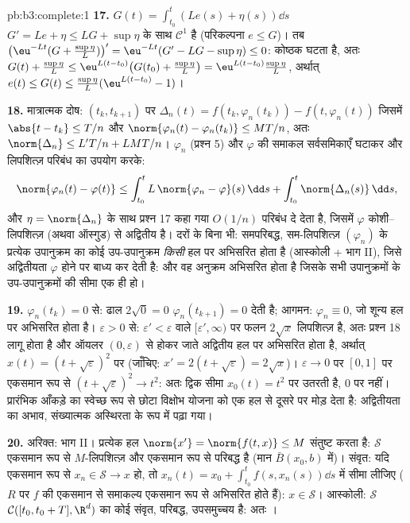 \begin{solution}{pb:b3:complete:1}
\textbf{17.} $G(t) = \int_{t_0}^t(Le(s) + \eta(s))\dd s$ $G' = Le + \eta \leq LG + \sup\eta$ के साथ $\mathcal C^1$ है (परिकल्पना $e \leq G$)। तब
$\bigl(\eu^{-Lt}(G +
\tfrac{\sup\eta}L)\bigr)' = \eu^{-Lt}(G' - LG - \sup\eta)
\leq 0$: कोष्ठक घटता है, अतः $G(t) + \frac{\sup\eta}L
\leq \eu^{L(t - t_0)}\bigl(G(t_0) + \frac{\sup\eta}L\bigr) =
\eu^{L(t-t_0)}\frac{\sup\eta}L$, अर्थात् $e(t) \leq G(t) \leq
\frac{\sup\eta}L(\eu^{L(t-t_0)} - 1)$।

\textbf{18.} मात्रात्मक दोष: $(t_k, t_{k+1})$ पर
$\Delta_n(t) = f(t_k, \varphi_n(t_k)) - f(t, \varphi_n(t))$
जिसमें $\abs{t - t_k} \leq T/n$ और $\norm{\varphi_n(t) -
\varphi_n(t_k)} \leq MT/n$, अतः $\norm{\Delta_n} \leq L'T/n +
LMT/n$। $\varphi_n$ (प्रश्न 5) और $\varphi$ की समाकल
सर्वसमिकाएँ घटाकर और लिपशित्ज़ परिबंध का उपयोग करके:
\[
\norm{\varphi_n(t) - \varphi(t)} \leq
\int_{t_0}^t L\,\norm{\varphi_n - \varphi}(s)\,\dd s +
\int_{t_0}^t\norm{\Delta_n(s)}\,\dd s,
\]
और $\eta = \norm{\Delta_n}$ के साथ प्रश्न 17 कहा गया $O(1/n)$ परिबंध दे देता है, जिसमें
$\varphi$ कोशी--लिपशित्ज़ (अथवा ऑस्गुड) से अद्वितीय है। दरों के बिना भी:
समपरिबद्ध, सम-लिपशित्ज़ $(\varphi_n)$ के प्रत्येक उपानुक्रम का कोई उप-उपानुक्रम
\emph{किसी} हल पर अभिसरित होता है (आस्कोली + भाग II), जिसे अद्वितीयता
$\varphi$ होने पर बाध्य कर देती है: और वह अनुक्रम अभिसरित होता है जिसके
सभी उपानुक्रमों के उप-उपानुक्रमों की सीमा एक ही हो।

\textbf{19.} $\varphi_n(t_k) = 0$ से: ढाल $2\sqrt0 =
0$ $\varphi_n(t_{k+1}) = 0$ देती है; आगमन: $\varphi_n
\equiv 0$, जो
शून्य हल पर अभिसरित होता है। $\varepsilon > 0$ से: $\varepsilon' < \varepsilon$ वाले $[\varepsilon', \infty)$ पर फलन $2\sqrt x$
लिपशित्ज़ है, अतः प्रश्न 18 लागू होता है और ऑयलर $(0, \varepsilon)$ से होकर जाते
अद्वितीय हल पर अभिसरित होता है, अर्थात् $x(t) =
(t + \sqrt\varepsilon)^2$ पर (जाँचिए: $x' = 2(t + \sqrt
\varepsilon) = 2\sqrt x$)।
$\varepsilon \to 0$ पर $[0,1]$ पर एकसमान रूप से $(t +
\sqrt\varepsilon)^2 \to t^2$: अतः द्विक सीमा $x_0(t) = t^2$ पर उतरती
है, $0$ पर नहीं। प्रारंभिक आँकड़े का स्वेच्छ रूप से छोटा विक्षोभ
योजना को एक हल से दूसरे पर मोड़ देता है: अद्वितीयता का अभाव, संख्यात्मक
अस्थिरता के रूप में पढ़ा गया।

\textbf{20.} अरिक्त: भाग II। प्रत्येक हल $\norm{x'} = \norm{f(t, x)} \leq M$ संतुष्ट करता है:
$\mathcal S$ एकसमान रूप से $M$-लिपशित्ज़ और एकसमान रूप से परिबद्ध है (मान
$\bar B(x_0, b)$ में)। संवृत: यदि एकसमान रूप से $x_n \in \mathcal S \to x$ हो, तो $x_n(t) = x_0 +
\int_{t_0}^tf(s, x_n(s))\dd s$ में सीमा
लीजिए ( $R$ पर $f$ की एकसमान  से समाकल्य एकसमान रूप
से अभिसरित होते हैं): $x \in \mathcal S$। आस्कोली: $\mathcal S$ $\mathcal C([t_0, t_0+T],
\R^d)$ का कोई संवृत,
परिबद्ध,  उपसमुच्चय है: अतः ।


\end{solution}
